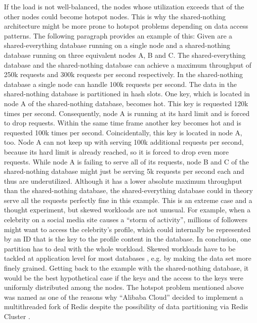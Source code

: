 If the load is not well-balanced, the nodes whose utilization exceeds that of the other nodes  could become hotspot nodes. 
This is why the shared-nothing architecture might be more prone to hotspot problems depending on data access patterns. The following paragraph provides an example of this:  \newline
Given are a shared-everything database running on a single node and a shared-nothing database running on three equivalent nodes A, B and C. The shared-everything database and the shared-nothing database can achieve a maximum throughput of 250k requests and 300k requests per second respectively. In the shared-nothing database a single node can handle 100k requests per second. The data in the shared-nothing database is partitioned in hash slots. One key, which is located in node A of the shared-nothing database, becomes hot. This key is requested 120k times per second. Consequently, node A is running at its hard limit and is forced to drop requests. Within the same time frame another key becomes hot and is requested 100k times per second. Coincidentally, this key is located in node A, too. Node A can not keep up with serving 100k additional requests per second, because its hard limit is already reached, so it is forced to drop even more requests. While node A is failing to serve all of its requests, node B and C of the shared-nothing database might just be serving 5k requests per second each and thus are underutilized. Although it has a lower absolute maximum throughput than the shared-nothing database, the shared-everything database could in theory serve all the requests perfectly fine in this example.
This is an extreme case and a thought experiment, but skewed workloads are not unusual. For example, when a celebrity on a social media site causes a “storm of activity”, millions of followers might want to access the celebrity's profile, which could internally be represented by an ID that is the key to the profile content in the database. In conclusion, one partition has to deal with the whole workload. Skewed workloads have to be tackled at application level for most databases \cite[205]{kleppmann:data}, e.g. by making the data set more finely grained. \newline
Getting back to the example with the shared-nothing database, it would be the best hypothetical case if the keys and the access to the keys were uniformly distributed among the nodes. \newline
The hotspot problem mentioned above was named as one of the reasons why “Alibaba Cloud” decided to implement a multithreaded fork of Redis despite the possibility of data partitioning via Redis Cluster \cite{alibaba:redis}. \newline
